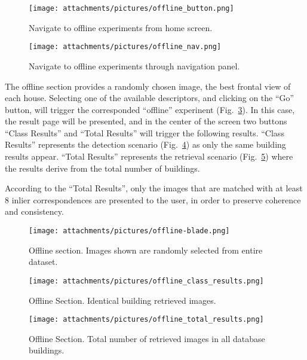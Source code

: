 \begin{figure}[ht!]
  \centering
  \texttt{[image: attachments/pictures/offline\_button.png]}
  \caption{Navigate to offline experiments from home screen.}
  \label{fig:trynow}
\end{figure} 

\begin{figure}[H]
  \centering
  \texttt{[image: attachments/pictures/offline\_nav.png]}
  \caption{Navigate to offline experiments through navigation panel.}
  \label{fig:offlinenav}
\end{figure} 

The offline section provides a randomly chosen image, the best frontal view of each house. Selecting one of the 
available descriptors, and clicking on the ``Go'' button, will trigger the corresponded ``offline'' experinent (Fig.~\ref{fig:offline-blade}).
In this case, the result page will be presented, and in the center of the screen two buttons ``Class Results''
and ``Total Results'' will trigger the following results.
``Class Results'' represents the detection scenario (Fig.~\ref{fig:offline_class_results}) as only the same building results appear.
``Total Results'' represents the retrieval scenario (Fig.~\ref{fig:offline_total_results}) where the results derive from the total number of buildings.


According to the ``Total Results'', only the images that are matched with at least $8$ inlier correspondences are presented to the user, in order to preserve coherence and consistency. 



\begin{figure}[ht!]
  \centering
  \texttt{[image: attachments/pictures/offline-blade.png]}
  \caption{Offline section. Images shown are randomly selected from entire dataset.}
  \label{fig:offline-blade}
\end{figure} 


\begin{figure}[htp!]
  \centering
  \texttt{[image: attachments/pictures/offline\_class\_results.png]}
  \caption{Offline Section. Identical building retrieved images.}
  \label{fig:offline_class_results}

\end{figure} 

\newpage

\begin{figure}[htp!]
  \centering
  \texttt{[image: attachments/pictures/offline\_total\_results.png]}
  \caption{Offline Section. Total number of retrieved images in all database buildings.}
  \label{fig:offline_total_results}
\end{figure} 

